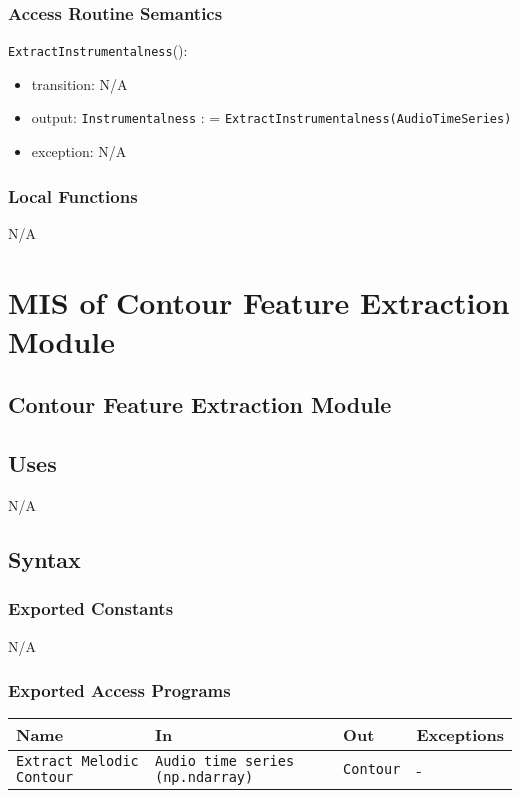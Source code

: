 \documentclass[12pt, titlepage]{article}
\begin{document}
\subsubsection{Access Routine Semantics}

\noindent \texttt{ExtractInstrumentalness}():
\begin{itemize}
\item transition: N/A
\item output: \texttt{Instrumentalness} : = \texttt{ExtractInstrumentalness(Audio\textunderscore Time\textunderscore Series)}
\item exception: N/A
\end{itemize}

\subsubsection{Local Functions}
N/A

\section{MIS of Contour Feature Extraction Module} 

\subsection{Contour Feature Extraction Module}

\subsection{Uses}
N/A

\subsection{Syntax}

\subsubsection{Exported Constants}
N/A

\subsubsection{Exported Access Programs}

\begin{center}
\begin{tabular}{p{2cm} p{4cm} p{4cm} p{2cm}}
\hline
\textbf{Name} & \textbf{In} & \textbf{Out} & \textbf{Exceptions}\\
\hline%
\texttt{Extract Melodic Contour} &\texttt{Audio time series (np.ndarray)} &\texttt{Contour} &-\\
\hline
\end{tabular}
\end{center}
\end{document}
